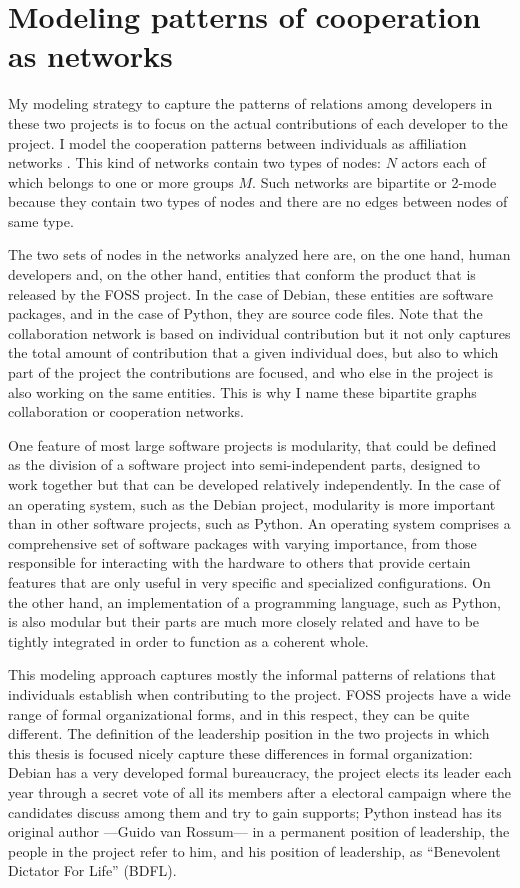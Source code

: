 \section{Modeling patterns of cooperation as networks}

My modeling strategy to capture the patterns of relations among developers in these two projects is to focus on the actual contributions of each developer to the project. I model the cooperation patterns between individuals as affiliation networks \citep[chapter 8]{wasserman:1994}. This kind of networks contain two types of nodes: $N$ actors each of which belongs to one or more groups $M$. Such networks are bipartite or 2-mode because they contain two types of nodes and there are no edges between nodes of same type.

The two sets of nodes in the networks analyzed here are, on the one hand, human developers and, on the other hand, entities that conform the product that is released by the FOSS project. In the case of Debian, these entities are software packages, and in the case of Python, they are source code files. Note that the collaboration network is based on individual contribution but it not only captures the total amount of contribution that a given individual does, but also to which part of the project the contributions are focused, and who else in the project is also working on the same entities. This is why I name these bipartite graphs collaboration or cooperation networks.

One feature of most large software projects is modularity, that could be defined as the division of a software project into semi-independent parts, designed to work together but that can be developed relatively independently. In the case of an operating system, such as the Debian project, modularity is more important than in other software projects, such as Python. An operating system comprises a comprehensive set of software packages with varying importance, from those responsible for interacting with the hardware to others that provide certain features that are only useful in very specific and specialized configurations. On the other hand, an implementation of a programming language, such as Python, is also modular but their parts are much more closely related and have to be tightly integrated in order to function as a coherent whole.

This modeling approach captures mostly the informal patterns of relations that individuals establish when contributing to the project. FOSS projects have a wide range of formal organizational forms, and in this respect, they can be quite different. The definition of the leadership position in the two projects in which this thesis is focused nicely capture these differences in formal organization: Debian has a very developed formal bureaucracy, the project elects its leader each year through a secret vote of all its members after a electoral campaign where the candidates discuss among them and try to gain supports; Python instead has its original author ---Guido van Rossum--- in a permanent position of leadership, the people in the project refer to him, and his position of leadership, as ``Benevolent Dictator For Life'' (BDFL).


